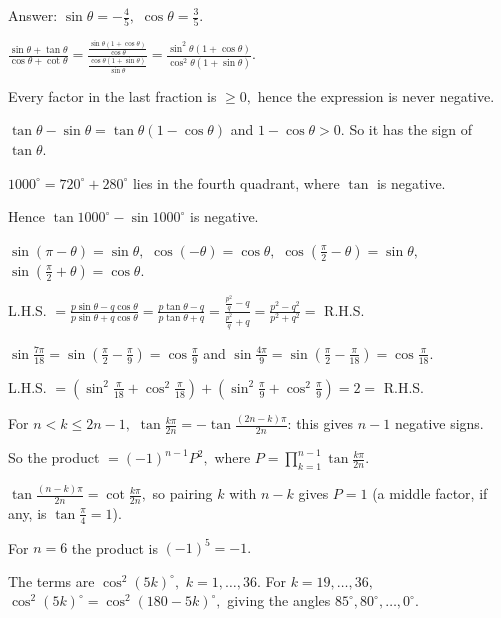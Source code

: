   Answer: $\sin\theta = -\frac{4}{5},$ $\cos\theta = \frac{3}{5}.$

\item $\frac{\sin\theta + \tan\theta}{\cos\theta + \cot\theta} = \frac{\frac{\sin\theta(1 + \cos\theta)}{\cos\theta}}
  {\frac{\cos\theta(1 + \sin\theta)}{\sin\theta}} = \frac{\sin^2\theta(1 + \cos\theta)}{\cos^2\theta(1 + \sin\theta)}.$

  Every factor in the last fraction is $\geq 0,$ hence the expression is never negative.

\item $\tan\theta - \sin\theta = \tan\theta(1 - \cos\theta)$ and $1 - \cos\theta > 0.$ So it has the sign of $\tan\theta.$

  $1000^\circ = 720^\circ + 280^\circ$ lies in the fourth quadrant, where $\tan$ is negative.

  Hence $\tan 1000^\circ - \sin 1000^\circ$ is negative.

\item $\sin(\pi - \theta) = \sin\theta,$ $\cos(-\theta) = \cos\theta,$ $\cos\left(\frac{\pi}{2} - \theta\right) = \sin\theta,$
  $\sin\left(\frac{\pi}{2} + \theta\right) = \cos\theta.$

  L.H.S. $= \frac{p\sin\theta - q\cos\theta}{p\sin\theta + q\cos\theta} = \frac{p\tan\theta - q}{p\tan\theta + q} =
  \frac{\frac{p^2}{q} - q}{\frac{p^2}{q} + q} = \frac{p^2 - q^2}{p^2 + q^2} =$ R.H.S.

\item $\sin\frac{7\pi}{18} = \sin\left(\frac{\pi}{2} - \frac{\pi}{9}\right) = \cos\frac{\pi}{9}$ and $\sin\frac{4\pi}{9} =
  \sin\left(\frac{\pi}{2} - \frac{\pi}{18}\right) = \cos\frac{\pi}{18}.$

  L.H.S. $= \left(\sin^2\frac{\pi}{18} + \cos^2\frac{\pi}{18}\right) + \left(\sin^2\frac{\pi}{9} + \cos^2\frac{\pi}{9}\right) = 2
  =$ R.H.S.

\item For $n < k \leq 2n - 1,$ $\tan\frac{k\pi}{2n} = -\tan\frac{(2n - k)\pi}{2n}$: this gives $n - 1$ negative signs.

  So the product $= (-1)^{n - 1}P^2,$ where $P = \prod_{k = 1}^{n - 1}\tan\frac{k\pi}{2n}.$

  $\tan\frac{(n - k)\pi}{2n} = \cot\frac{k\pi}{2n},$ so pairing $k$ with $n - k$ gives $P = 1$ (a middle factor, if any, is
  $\tan\frac{\pi}{4} = 1$).

  For $n = 6$ the product is $(-1)^5 = -1.$

\item The terms are $\cos^2(5k)^\circ,$ $k = 1, \ldots, 36.$ For $k = 19, \ldots, 36,$ $\cos^2(5k)^\circ = \cos^2(180 -
  5k)^\circ,$ giving the angles $85^\circ, 80^\circ, \ldots, 0^\circ.$

